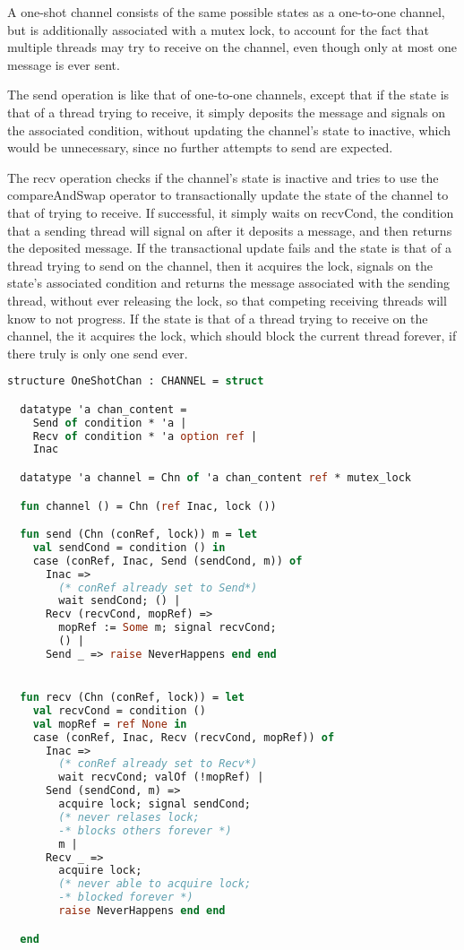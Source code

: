 \documentclass{article}
\begin{document}
A one-shot channel consists of the same possible states as a one-to-one channel, but is
additionally associated with a mutex lock, to account for the fact that multiple threads may
try to receive on the channel, even though only at most one message is ever sent.

The send operation is like that of one-to-one channels, except that if the state is that of a
thread trying to receive, it simply deposits the message and signals on the associated
condition, without updating the channel's state to inactive, which would be unnecessary, since
no further attempts to send are expected.

The recv operation checks if the channel's state is inactive and tries to use the
compareAndSwap operator to transactionally update the state of the channel to that of trying
to receive.  If successful, it simply waits on recvCond, the condition that a sending thread
will signal on after it deposits a message, and then returns the deposited message.  If the
transactional update fails and the state is that of a thread trying to send on the channel,
then it acquires the lock, signals on the state's associated condition and returns the message
associated with the sending thread, without ever releasing the lock, so that competing
receiving threads will know to not progress.  If the state is that of a thread trying to
receive on the channel, the it acquires the lock, which should block the current thread
forever, if there truly is only one send ever.


\begin{lstlisting}[language=ML, escapechar=\%]
  structure OneShotChan : CHANNEL = struct

  datatype 'a chan_content =
    Send of condition * 'a |
    Recv of condition * 'a option ref |
    Inac  

  datatype 'a channel = Chn of 'a chan_content ref * mutex_lock

  fun channel () = Chn (ref Inac, lock ())

  fun send (Chn (conRef, lock)) m = let
    val sendCond = condition () in
    case (conRef, Inac, Send (sendCond, m)) of
      Inac =>
        (* conRef already set to Send*)
        wait sendCond; () |
      Recv (recvCond, mopRef) =>
        mopRef := Some m; signal recvCond;
        () |
      Send _ => raise NeverHappens end end


  fun recv (Chn (conRef, lock)) = let
    val recvCond = condition ()
    val mopRef = ref None in
    case (conRef, Inac, Recv (recvCond, mopRef)) of
      Inac =>
        (* conRef already set to Recv*)
        wait recvCond; valOf (!mopRef) |
      Send (sendCond, m) =>
        acquire lock; signal sendCond;
        (* never relases lock;
        -* blocks others forever *)
        m |
      Recv _ =>
        acquire lock;
        (* never able to acquire lock;
        -* blocked forever *)
        raise NeverHappens end end

  end
  \end{lstlisting}
\end{document}
